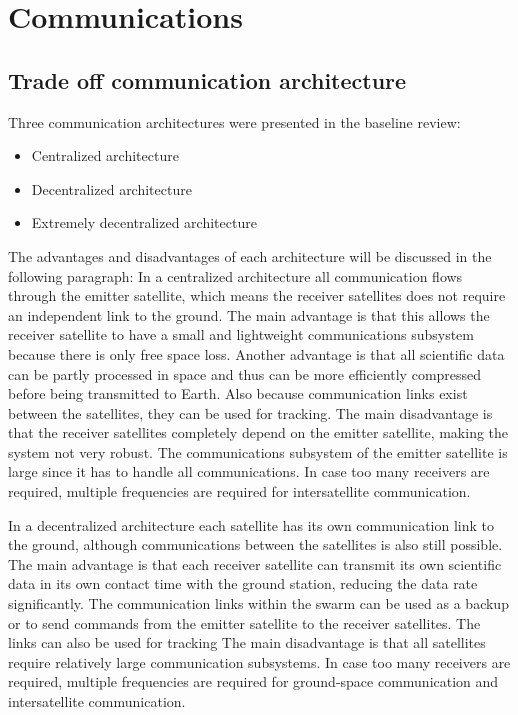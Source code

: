 \section{Communications}
\label{mtrTOCOM}

\subsection{Trade off communication architecture}
Three communication architectures were presented in the baseline review:
\begin{itemize}
\item Centralized architecture
\item Decentralized architecture
\item Extremely decentralized architecture
\end{itemize}

The advantages and disadvantages of each architecture will be discussed in the following paragraph:
In a centralized architecture all communication flows through the emitter satellite, which means the receiver satellites does not require an independent link to the ground.
The main advantage is that this allows the receiver satellite to have a small and lightweight communications subsystem because there is only free space loss. Another advantage is that all scientific data can be partly processed in space and thus can be more efficiently compressed before being transmitted to Earth. Also because communication links exist between the satellites, they can be used for tracking.
The main disadvantage is that the receiver satellites completely depend on the emitter satellite, making the system not very robust. The communications subsystem of the emitter satellite is large since it has to handle all communications. In case too many receivers are required, multiple frequencies are required for intersatellite communication.

In a decentralized architecture each satellite has its own communication link to the ground, although communications between the satellites is also still possible.
The main advantage is that each receiver satellite can transmit its own scientific data in its own contact time with the ground station, reducing the data rate significantly. The communication links within the swarm can be used as a backup or to send commands from the emitter satellite to the receiver satellites. The links can also be used for tracking
The main disadvantage is that all satellites require relatively large communication subsystems. In case too many receivers are required, multiple frequencies are required for ground-space communication and intersatellite communication.

